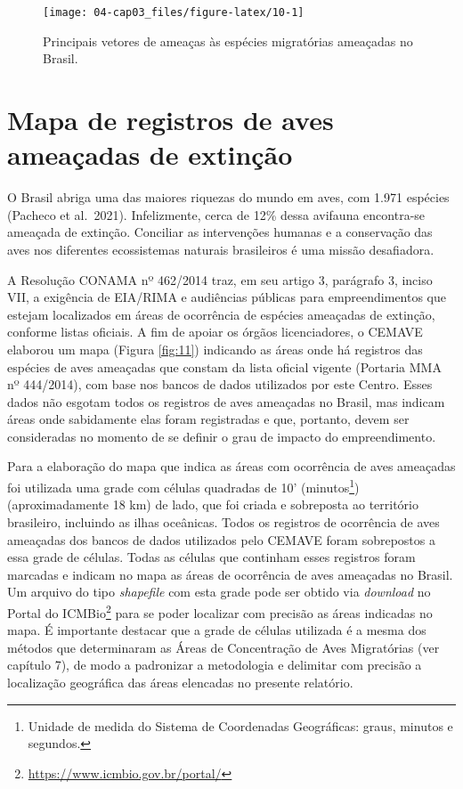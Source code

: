 \documentclass[
  oneside]{scrbook}
\DeclareRobustCommand{\href}[2]{#2\footnote{\url{#1}}}
\begin{document}
\begin{figure}[H]

{\centering \texttt{[image: 04-cap03\_files/figure-latex/10-1]} 

}

\caption{Principais vetores de ameaças às espécies migratórias ameaçadas no Brasil.}\label{fig:10}
\end{figure}

\newpage

\hypertarget{mapa-de-registros-de-aves-ameauxe7adas-de-extinuxe7uxe3o}{%
\section{Mapa de registros de aves ameaçadas de extinção}\label{mapa-de-registros-de-aves-ameauxe7adas-de-extinuxe7uxe3o}}

O Brasil abriga uma das maiores riquezas do mundo em aves, com 1.971 espécies (Pacheco et al.~2021). Infelizmente, cerca de 12\% dessa avifauna encontra-se ameaçada de extinção. Conciliar as intervenções humanas e a conservação das aves nos diferentes ecossistemas naturais brasileiros é uma missão desafiadora.

A Resolução CONAMA nº 462/2014 traz, em seu artigo 3, parágrafo 3, inciso VII, a exigência de EIA/RIMA e audiências públicas para empreendimentos que estejam localizados em áreas de ocorrência de espécies ameaçadas de extinção, conforme listas oficiais. A fim de apoiar os órgãos licenciadores, o CEMAVE elaborou um mapa (Figura \ref{fig:11}) indicando as áreas onde há registros das espécies de aves ameaçadas que constam da lista oficial vigente (Portaria MMA nº 444/2014), com base nos bancos de dados utilizados por este Centro. Esses dados não esgotam todos os registros de aves ameaçadas no Brasil, mas indicam áreas onde sabidamente elas foram registradas e que, portanto, devem ser consideradas no momento de se definir o grau de impacto do empreendimento.

Para a elaboração do mapa que indica as áreas com ocorrência de aves ameaçadas foi utilizada uma grade com células quadradas de 10' (minutos\footnote{Unidade de medida do Sistema de Coordenadas Geográficas: graus, minutos e segundos.}) (aproximadamente 18 km) de lado, que foi criada e sobreposta ao território brasileiro, incluindo as ilhas oceânicas. Todos os registros de ocorrência de aves ameaçadas dos bancos de dados utilizados pelo CEMAVE foram sobrepostos a essa grade de células. Todas as células que continham esses registros foram marcadas e indicam no mapa as áreas de ocorrência de aves ameaçadas no Brasil. Um arquivo do tipo \emph{shapefile} com esta grade pode ser obtido via \emph{download} no \href{https://www.icmbio.gov.br/portal/}{Portal do ICMBio} para se poder localizar com precisão as áreas indicadas no mapa. É importante destacar que a grade de células utilizada é a mesma dos métodos que determinaram as Áreas de Concentração de Aves Migratórias (ver capítulo 7), de modo a padronizar a metodologia e delimitar com precisão a localização geográfica das áreas elencadas no presente relatório.
\end{document}
